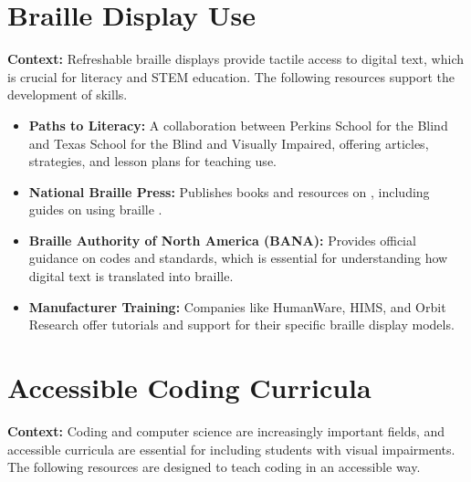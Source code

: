 \section[\gidx{brailledisplay}{Braille Display} Use]{Braille Display Use}\label{app4:braille-display-use}

\noindent
\textbf{Context:} Refreshable braille displays provide tactile access to digital text, which is crucial for literacy and STEM education. The following resources support the development of  skills.

\begin{itemize}
	\item \textbf{Paths to Literacy:} A collaboration between Perkins School for the Blind and Texas School for the Blind and Visually Impaired, offering articles, strategies, and lesson plans for teaching  use.
	\item \textbf{National Braille Press:} Publishes books and resources on , including guides on using braille .
	\item \textbf{Braille Authority of North America (BANA):} Provides official guidance on  codes and standards, which is essential for understanding how digital text is translated into braille.
	\item \textbf{Manufacturer Training:} Companies like HumanWare, HIMS, and Orbit Research offer tutorials and support for their specific braille display models.
\end{itemize}

\section[Accessible Coding Curricula]{Accessible Coding Curricula}\label{app4:coding-curricula}

\noindent
\textbf{Context:} Coding and computer science are increasingly important fields, and accessible curricula are essential for including students with visual impairments. The following resources are designed to teach coding in an accessible way.

